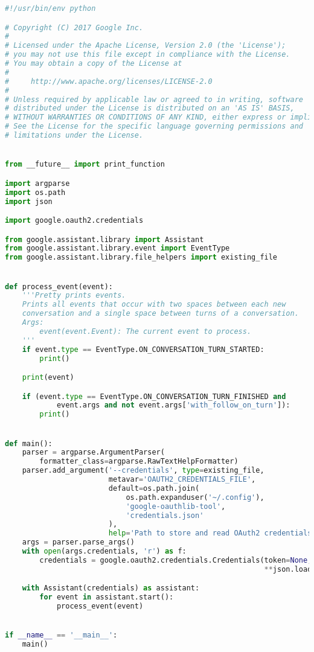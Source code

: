 \begin{lstlisting}[language=Python]
#!/usr/bin/env python

# Copyright (C) 2017 Google Inc.
#
# Licensed under the Apache License, Version 2.0 (the 'License');
# you may not use this file except in compliance with the License.
# You may obtain a copy of the License at
#
#     http://www.apache.org/licenses/LICENSE-2.0
#
# Unless required by applicable law or agreed to in writing, software
# distributed under the License is distributed on an 'AS IS' BASIS,
# WITHOUT WARRANTIES OR CONDITIONS OF ANY KIND, either express or implied.
# See the License for the specific language governing permissions and
# limitations under the License.


from __future__ import print_function

import argparse
import os.path
import json

import google.oauth2.credentials

from google.assistant.library import Assistant
from google.assistant.library.event import EventType
from google.assistant.library.file_helpers import existing_file


def process_event(event):
    '''Pretty prints events.
    Prints all events that occur with two spaces between each new
    conversation and a single space between turns of a conversation.
    Args:
        event(event.Event): The current event to process.
    '''
    if event.type == EventType.ON_CONVERSATION_TURN_STARTED:
        print()

    print(event)

    if (event.type == EventType.ON_CONVERSATION_TURN_FINISHED and
            event.args and not event.args['with_follow_on_turn']):
        print()


def main():
    parser = argparse.ArgumentParser(
        formatter_class=argparse.RawTextHelpFormatter)
    parser.add_argument('--credentials', type=existing_file,
                        metavar='OAUTH2_CREDENTIALS_FILE',
                        default=os.path.join(
                            os.path.expanduser('~/.config'),
                            'google-oauthlib-tool',
                            'credentials.json'
                        ),
                        help='Path to store and read OAuth2 credentials')
    args = parser.parse_args()
    with open(args.credentials, 'r') as f:
        credentials = google.oauth2.credentials.Credentials(token=None,
                                                            **json.load(f))

    with Assistant(credentials) as assistant:
        for event in assistant.start():
            process_event(event)


if __name__ == '__main__':
    main()
    
\end{lstlisting}


